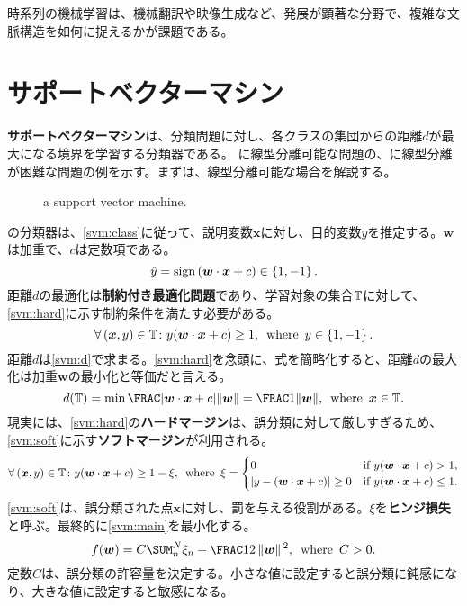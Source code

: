\documentclass[10pt,a4paper]{book}
\begin{document}
時系列の機械学習は、機械翻訳や映像生成など、発展が顕著な分野で、複雑な文脈構造を如何に捉えるかが課題である。

\chapter{サポートベクターマシン}

\textbf{サポートベクターマシン}は、分類問題に対し、各クラスの集団からの距離$d$が最大になる境界を学習する分類器である。
に線型分離可能な問題の、に線型分離が困難な問題の例を示す。まずは、線型分離可能な場合を解説する。

\begin{figure}[h]
\centering
{}
\caption{a support vector machine.\label{fig:svm}}
\end{figure}

の分類器は、\eqref{svm:class}に従って、説明変数$\bm{x}$に対し、目的変数$y$を推定する。$\bm{w}$は加重で、$c$は定数項である。
%
\begin{equation}
\label{eq:svm:class}
\hat{y} = \sign{\dprod{\bm{w}}{\bm{x}}+c} \in \seq{1,-1}.
\end{equation}
%
距離$d$の最適化は\textbf{制約付き最適化問題}であり、学習対象の集合$\mathbb{T}$に対して、\eqref{svm:hard}に示す制約条件を満たす必要がある。
%
\begin{equation}
\label{eq:svm:hard}
\forall \pair{\bm{x}}{y} \in \TRAIN \colon y(\dprod{\bm{w}}{\bm{x}} + c) \geq 1,
\where
y\in\seq{1,-1}.
\end{equation}
%
距離$d$は\eqref{svm:d}で求まる。\eqref{svm:hard}を念頭に、式を簡略化すると、距離$d$の最大化は加重$\bm{w}$の最小化と等価だと言える。
%
\begin{equation}
\label{eq:svm:d}
d(\TRAIN) = \min\frac{\abs{\dprod{\bm{w}}{\bm{x}} + c}}{\norm{\bm{w}}} = \frac{1}{\norm{\bm{w}}},
\where
\bm{x}\in\TRAIN.
\end{equation}
%
現実には、\eqref{svm:hard}の\textbf{ハードマージン}は、誤分類に対して厳しすぎるため、\eqref{svm:soft}に示す\textbf{ソフトマージン}が利用される。
%
\begin{equation}
\label{eq:svm:soft}
\forall \pair{\bm{x}}{y} \in \TRAIN \colon
y (\dprod{\bm{w}}{\bm{x}} + c) \geq 1 - \xi,
\where
\xi =
\begin{cases}
0 & \text{if $y(\dprod{\bm{w}}{\bm{x}} + c) > 1$}, \\
\abs{y - (\dprod{\bm{w}}{\bm{x}} + c)} \geq 0 & \text{if $y(\dprod{\bm{w}}{\bm{x}} + c) \leq 1$}.
\end{cases}
\end{equation}
%
\eqref{svm:soft}は、誤分類された点$\bm{x}$に対し、罰を与える役割がある。$\xi$を\textbf{ヒンジ損失}と呼ぶ。最終的に\eqref{svm:main}を最小化する。
%
\begin{equation}
\label{eq:svm:main}
f(\bm{w}) = C \sum_n^N \xi_n + \frac{1}{2}\norm{\bm{w}}^2,
\where
C>0.
\end{equation}
%
定数$C$は、誤分類の許容量を決定する。小さな値に設定すると誤分類に鈍感になり、大きな値に設定すると敏感になる。
\end{document}
